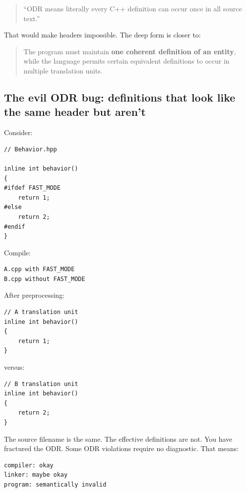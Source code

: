 \begin{quote}
``ODR means literally every C++ definition can occur once in all source text.''
\end{quote}

That would make headers impossible. The deep form is closer to:

\begin{quote}
The program must maintain \textbf{one coherent definition of an entity}, while the language permits certain equivalent definitions to occur in multiple translation units.
\end{quote}

\subsection{The evil ODR bug: definitions that look like the same header but aren't}\label{05-engine-i-ch002-the-evil-odr-bug-definitions-that-look-like-the-same-header-but-arent}

\hypertarget{05-engine-i-ch002-the-evil-odr-bug-definitions-that-look-like-the-same-header-but-arent}{}

Consider:

\begin{verbatim}
// Behavior.hpp

inline int behavior()
{
#ifdef FAST_MODE
    return 1;
#else
    return 2;
#endif
}
\end{verbatim}

Compile:

\begin{verbatim}
A.cpp with FAST_MODE
B.cpp without FAST_MODE
\end{verbatim}

After preprocessing:

\begin{verbatim}
// A translation unit
inline int behavior()
{
    return 1;
}
\end{verbatim}

versus:

\begin{verbatim}
// B translation unit
inline int behavior()
{
    return 2;
}
\end{verbatim}

The source filename is the same. The effective definitions are not. You have fractured the ODR. Some ODR violations require no diagnostic. That means:

\begin{verbatim}
compiler: okay
linker: maybe okay
program: semantically invalid
\end{verbatim}

